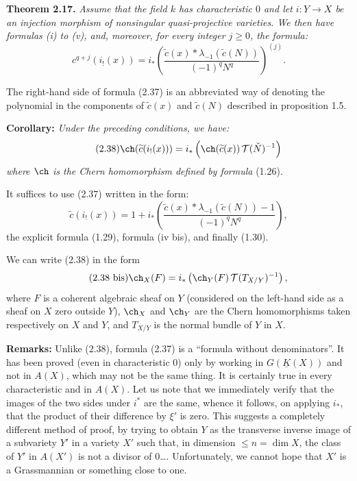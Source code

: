 \textbf{Theorem 2.17.} \emph{Assume that the field $k$ has characteristic $0$ and let $i:Y\longrightarrow X$ be an injection morphism of nonsingular quasi-projective varieties. We then have formulas (i) to (v), and, moreover, for every integer $j\geq0$, the formula:}
\begin{equation}\tag{2.37}
 c^{q+j}(i_!(x))=i_*\left(\frac{\widetilde c(x)*\lambda_{-1}(\widetilde c(N))}{(-1)^qN^q}\right)^{(j)}.
\end{equation}

The right-hand side of formula (2.37) is an abbreviated way of denoting the polynomial in the components of $\widetilde c(x)$ and $\widetilde c(N)$ described in proposition 1.5.

\textbf{Corollary:} \emph{Under the preceding conditions, we have:}
\begin{equation}\tag{2.38}
 \ch(\widetilde c(i_!(x)))=i_*\left(\ch(\widetilde c(x))\,\mathcal T(\check N)^{-1}\right)
\end{equation}
\emph{where $\ch$ is the Chern homomorphism defined by formula} (1.26).

%
It suffices to use (2.37) written in the form:
\begin{equation}\tag{2.37 bis}
 \widetilde c(i_!(x))=1+i_*\left(\frac{\widetilde c(x)*\lambda_{-1}(\widetilde c(N))-1}{(-1)^qN^q}\right),
\end{equation}
the explicit formula (1.29), formula (iv bis), and finally (1.30).

We can write (2.38) in the form
\begin{equation}\tag{2.38 bis}
 \ch_X(F)=i_*\left(\ch_Y(F)\,\mathcal T(T_{X/Y})^{-1}\right),
\end{equation}
where $F$ is a coherent algebraic sheaf on $Y$ (considered on the left-hand side as a sheaf on $X$ zero outside $Y$), $\ch_X$ and $\ch_Y$ are the Chern homomorphisms taken respectively on $X$ and $Y$, and $T_{X/Y}$ is the normal bundle of $Y$ in $X$.

\textbf{Remarks:} Unlike (2.38), formula (2.37) is a ``formula without denominators''. It has been proved (even in characteristic $0$) only by working in $G(\underline K(X))$ and not in $A(X)$, which may not be the same thing. It is certainly true in every characteristic and in $A(X)$. Let us note that we immediately verify that the images of the two sides under $i^*$ are the same, whence it follows, on applying $i_*$, that the product of their difference by $\xi'$ is zero. This suggests a completely different method of proof, by trying to obtain $Y$ as the transverse inverse image of a subvariety $Y'$ in a variety $X'$ such that, in dimension $\leq n=\dim X$, the class of $Y'$ in $A(X')$ is not a divisor of $0$\dots. Unfortunately, we cannot hope that $X'$ is a Grassmannian or something close to one.

